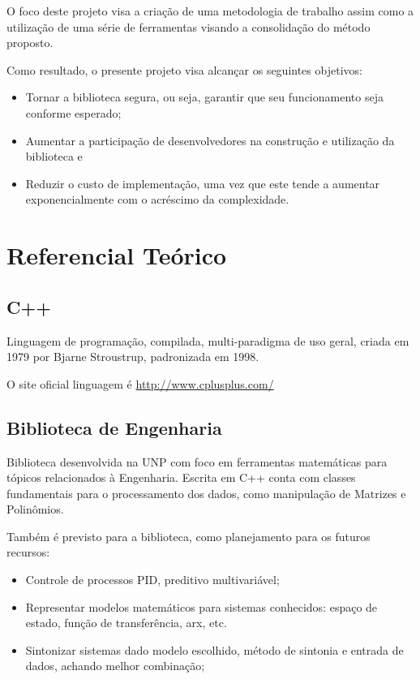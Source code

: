 \documentclass[
	article,			%
	12pt,				%
	oneside,			%
	a4paper,			%
	english,			
	brazil,
	sumario=tradicional
	]{abntex2}
\begin{document}
O foco deste projeto visa a criação de uma metodologia de trabalho assim como a utilização de uma série de ferramentas visando a consolidação do método proposto.

Como resultado, o presente projeto visa alcançar os seguintes objetivos:
\begin{itemize}
	\item{Tornar a biblioteca segura, ou seja, garantir que seu funcionamento seja conforme esperado;}
	\item{Aumentar a participação de desenvolvedores na construção e utilização da biblioteca e}
	\item{Reduzir o custo de implementação, uma vez que este tende a aumentar exponencialmente com o acréscimo da complexidade.}
\end{itemize}

\pagebreak
\section{Referencial Teórico}


\subsection{C++}

Linguagem de programação, compilada, multi-paradigma de uso geral, criada em 1979 por Bjarne Stroustrup, padronizada em 1998.

O site oficial linguagem é \href{http://www.cplusplus.com/}{http://www.cplusplus.com/}


\subsection{Biblioteca de Engenharia}

Biblioteca desenvolvida na UNP com foco em ferramentas matemáticas para tópicos relacionados à Engenharia. Escrita em C++ conta com classes fundamentais para o processamento dos dados, como manipulação de Matrizes e Polinômios. 

Também é previsto para a biblioteca, como planejamento para os futuros recursos:

\begin{itemize}
	\item{Controle de processos PID, preditivo multivariável;}
	\item Representar modelos matemáticos para sistemas conhecidos: espaço de estado, função de transferência, arx, etc.
	\item Sintonizar sistemas dado modelo escolhido, método de sintonia e entrada de dados, achando melhor combinação;
\end{itemize}
\end{document}
